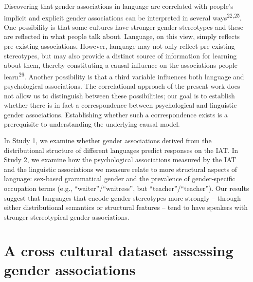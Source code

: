 \documentclass[9pt,twocolumn]{pnas-new}
\begin{document}
Discovering that gender associations in language are correlated with people’s implicit and explicit gender associations can be interpreted in several ways\textsuperscript{22,25}.  One possibility is that some cultures have stronger gender stereotypes and these are reflected in what people talk about. Language, on this view, simply reflects pre-existing associations. However, language may not only reflect pre-existing stereotypes, but may also provide a distinct source of information for
learning about them, thereby constituting a causal influence on the associations people learn\textsuperscript{26}. Another possibility is that a third variable influences both language and psychological associations. The correlational approach of the present work does not allow us to distinguish between these possibilities; our  goal is to establish whether there is in fact a correspondence between psychological and linguistic gender associations. Establishing whether such a correspondence exists is a prerequisite to understanding the underlying causal model.

In Study 1, we examine whether gender associations derived from the distributional structure of different languages predict responses on the IAT. In Study 2, we examine how the psychological
associations measured by the IAT and the linguistic associations we measure relate
to more structural aspects of language: sex-based grammatical gender and
the prevalence of gender-specific occupation terms (e.g.,
\enquote{waiter}/\enquote{waitress}, but
\enquote{teacher}/\enquote{teacher}). Our results suggest that languages that encode gender stereotypes more strongly -- through either distributional semantics or structural features -- tend to have speakers with stronger stereotypical gender associations. 

\section*{A cross cultural dataset assessing gender associations}\label{description-of-cross-cultural-dataset-of-psychological-gender-bias}
\end{document}
